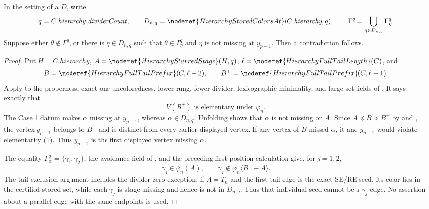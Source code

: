 \begin{lemma}
In the setting of a
 \(D\), write
\[
 q=C.\mathit{hierarchy}.\mathit{dividerCount},\qquad
 D_{n,q}=\noderef{HierarchyStoredColorsAt}(C.\mathit{hierarchy},q),
 \qquad
 \Gamma^q=\bigcup_{\eta\in D_{n,q}}\Gamma^q_\eta .
\]
Suppose either \(\theta\notin\Gamma^q\), or there is
\(\eta\in D_{n,q}\) such that
\(\theta\in\Gamma^q_\eta\) and \(\eta\) is not missing at
\(y_{p-1}\).  Then a contradiction follows.
\end{lemma}
\begin{proof}
Put \(H=C.\mathit{hierarchy}\),
\(A=\noderef{HierarchyStarredStage}(H,q)\),
\(\ell=\noderef{HierarchyFullTailLength}(C)\), and
\[
 B=\noderef{HierarchyFullTailPrefix}(C,\ell-2),\qquad
 B^+=\noderef{HierarchyFullTailPrefix}(C,\ell-1).
\]
Apply  to the
properness, exact one-uncoloredness, lower-rung, fewer-divider,
lexicographic-minimality, and large-set fields of
.  It says exactly that
\[
                  V(B^+)\text{ is elementary under }\varphi_n.       \tag{1}
\]
The Case 1 datum makes \(\alpha\) missing at \(y_{p-1}\), whereas
\(\alpha\in D_{n,q}\).  Unfolding
 shows that \(\alpha\) is not missing
on \(A\).  Since \(A\preccurlyeq B\preccurlyeq B^+\) by
 and
, the vertex \(y_{p-1}\) belongs to
\(B^+\) and is distinct from every earlier displayed vertex.  If any
vertex of \(B\) missed \(\alpha\), it and \(y_{p-1}\) would violate
elementarity (1).  Thus \(y_{p-1}\) is the first displayed vertex
missing \(\alpha\).

The equality
\(\Gamma^q_\alpha=\{\gamma_1,\gamma_2\}\), the avoidance field of
, and the preceding first-position calculation
give, for \(j=1,2\),
\[
 \gamma_j\in\overline\varphi_n(A),\qquad
 \gamma_j\notin
 \varphi_n\langle B^+-A\rangle .                              \tag{2}
\]
The tail-exclusion argument includes the divider-zero exception:
if \(A=T_n\) and the first tail edge is the exact SE/RE seed, its color
lies in the certified stored set, while each \(\gamma_j\) is
stage-missing and hence is not in \(D_{n,q}\).  Thus that individual
seed cannot be a \(\gamma_j\)-edge.  No assertion about a parallel edge
with the same endpoints is used.


\end{proof}
